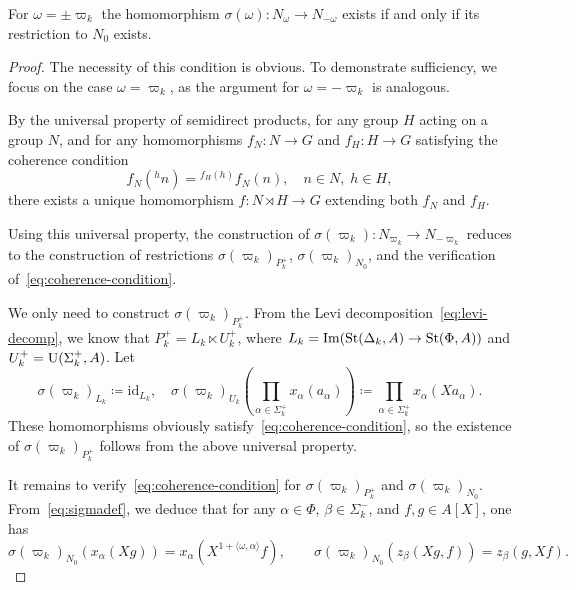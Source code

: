 \begin{lemma} \label{lem:first-reduction}
For $\omega = \pm \varpi_k$ the homomorphism $\sigma(\omega)\colon N_\omega \to N_{-\omega}$ exists if and only if its restriction to $N_0$ exists.
\end{lemma}
\begin{proof}
    The necessity of this condition is obvious.
    To demonstrate sufficiency, we focus on the case $\omega = \varpi_k$, as the argument for $\omega = -\varpi_k$ is analogous.

    By the universal property of semidirect products, for any group $H$ acting on a group $N$, and for any homomorphisms $f_N\colon N \to G$ and $f_H\colon H \to G$ satisfying the coherence condition
    \begin{equation}
        \label{eq:coherence-condition}
        f_N({}^hn) = {}^{f_H(h)} f_N(n), \quad n \in N, \; h \in H,
    \end{equation}
    there exists a unique homomorphism $f\colon N \rtimes H \to G$ extending both $f_N$ and $f_H$.

    Using this universal property, the construction of \( \sigma(\varpi_k) \colon N_{\varpi_k} \to N_{-\varpi_k} \) reduces to the construction of
     restrictions \( \sigma(\varpi_k)_{P_k^+} \), \( \sigma(\varpi_k)_{N_0} \), and the verification of~\eqref{eq:coherence-condition}.

    We only need to construct \( \sigma(\varpi_k)_{P_k^+} \).
    From the Levi decomposition~\eqref{eq:levi-decomp}, we know that \( P_k^+ = L_k \ltimes U_k^+ \), where \( L_k = \mathrm{Im}(\operatorname{St}(\Delta_k, A) \to \operatorname{St}(\Phi, A)) \) and
     \( U_k^+ = \operatorname{U}(\Sigma_k^+, A) \).
    Let
    \begin{equation} \label{eq:sigma-Pk}
    \sigma(\varpi_k)_{L_k} \coloneqq \mathrm{id}_{L_k}, \quad
    \sigma(\varpi_k)_{U_k} \left(\prod_{\alpha \in \Sigma_k^+} x_\alpha(a_\alpha)\right) \coloneqq \prod_{\alpha \in \Sigma_k^+} x_\alpha(Xa_\alpha).
    \end{equation}
    These homomorphisms obviously satisfy~\eqref{eq:coherence-condition}, so the existence of \( \sigma(\varpi_k)_{P_k^+} \) follows from the above universal property.

    It remains to verify~\eqref{eq:coherence-condition} for \( \sigma(\varpi_k)_{P_k^+} \) and \( \sigma(\varpi_k)_{N_0} \).
    From~\eqref{eq:sigmadef}, we deduce that for any \( \alpha \in \Phi \), \( \beta \in \Sigma_k^- \), and \( f, g \in A[X] \), one has
    \begin{equation} \label{eq:charact}
    \sigma(\varpi_k)_{N_0}(x_\alpha(Xg)) = x_\alpha(X^{1 + \langle \omega, \alpha \rangle}f), \qquad
    \sigma(\varpi_k)_{N_0}(z_\beta(Xg, f)) = z_\beta(g, Xf).
    \end{equation}


\end{proof}
